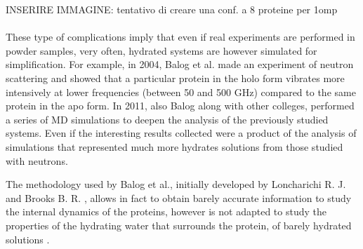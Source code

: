 INSERIRE IMMAGINE: tentativo di creare una conf. a 8 proteine per 1omp\\
\\
These type of complications imply that even if real experiments are performed in powder samples, very often, hydrated systems are however simulated for simplification. For example, in 2004, Balog et al. made an experiment of neutron scattering and showed that a particular protein in the holo form vibrates more intensively at lower frequencies (between 50 and 500 GHz) compared to the same protein in the apo form.
In 2011, also Balog along with other colleges, performed a series of MD simulations to deepen the analysis of the previously studied systems. Even if the interesting results collected were a product of the analysis of simulations that represented much more hydrates solutions from those studied with neutrons.

The methodology used by Balog et al., initially developed by Loncharichi R. J. and Brooks B. R. \cite{loncharich1990temperature}, allows in fact to obtain barely accurate information to study the internal dynamics of the proteins, however is not adapted to study the properties of the hydrating water that surrounds the protein, of barely hydrated solutions \cite{tarek2000dynamics}.

